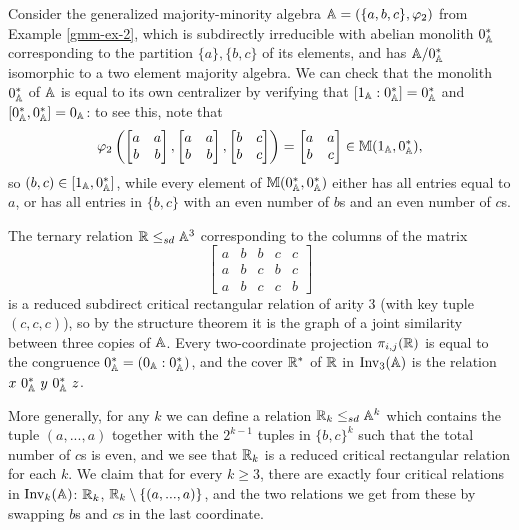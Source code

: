 \documentclass[letterpaper,11pt]{article}
\DeclareMathOperator{\Inv}{Inv}
\begin{document}
\begin{ex}\label{gmm-ex-2-critical} Consider the generalized majority-minority algebra $\mathbb{A} = (\{a,b,c\}, \varphi_2)$ from Example \ref{gmm-ex-2}, which is subdirectly irreducible with abelian monolith $0_{\mathbb{A}}^*$ corresponding to the partition $\{a\}, \{b,c\}$ of its elements, and has $\mathbb{A}/0_{\mathbb{A}}^*$ isomorphic to a two element majority algebra. We can check that the monolith $0_{\mathbb{A}}^*$ of $\mathbb{A}$ is equal to its own centralizer by verifying that $[1_{\mathbb{A}}:0_{\mathbb{A}}^*] = 0_{\mathbb{A}}^*$ and $[0_{\mathbb{A}}^*,0_{\mathbb{A}}^*] = 0_{\mathbb{A}}$: to see this, note that
\[
\varphi_2\left(\begin{bmatrix} a & a\\ b & b\end{bmatrix}, \begin{bmatrix} a & a\\ b & b\end{bmatrix}, \begin{bmatrix} b & c\\ b & c\end{bmatrix}\right) = \begin{bmatrix} a & a\\ b & c\end{bmatrix} \in \mathbb{M}(1_{\mathbb{A}},0_{\mathbb{A}}^*),
\]
so $(b,c) \in [1_{\mathbb{A}},0_{\mathbb{A}}^*]$, while every element of $\mathbb{M}(0_{\mathbb{A}}^*,0_{\mathbb{A}}^*)$ either has all entries equal to $a$, or has all entries in $\{b,c\}$ with an even number of $b$s and an even number of $c$s.

The ternary relation $\mathbb{R} \le_{sd} \mathbb{A}^3$ corresponding to the columns of the matrix
\[
\begin{bmatrix} a & b & b & c & c\\ a & b & c & b & c\\ a & b & c & c & b\end{bmatrix}
\]
is a reduced subdirect critical rectangular relation of arity $3$ (with key tuple $(c,c,c)$), so by the structure theorem it is the graph of a joint similarity between three copies of $\mathbb{A}$. Every two-coordinate projection $\pi_{i,j}(\mathbb{R})$ is equal to the congruence $0_{\mathbb{A}}^* = (0_{\mathbb{A}} : 0_{\mathbb{A}}^*)$, and the cover $\mathbb{R}^*$ of $\mathbb{R}$ in $\Inv_3(\bA)$ is the relation $x\ 0_\bA^*\ y\ 0_\bA^*\ z$.

More generally, for any $k$ we can define a relation $\mathbb{R}_k \le_{sd} \mathbb{A}^k$ which contains the tuple $(a,...,a)$ together with the $2^{k-1}$ tuples in $\{b,c\}^k$ such that the total number of $c$s is even, and we see that $\mathbb{R}_k$ is a reduced critical rectangular relation for each $k$. We claim that for every $k \ge 3$, there are exactly four critical relations in $\Inv_k(\bA)$: $\mathbb{R}_k$, $\mathbb{R}_k \setminus\{(a,...,a)\}$, and the two relations we get from these by swapping $b$s and $c$s in the last coordinate.


\end{ex}
\end{document}
